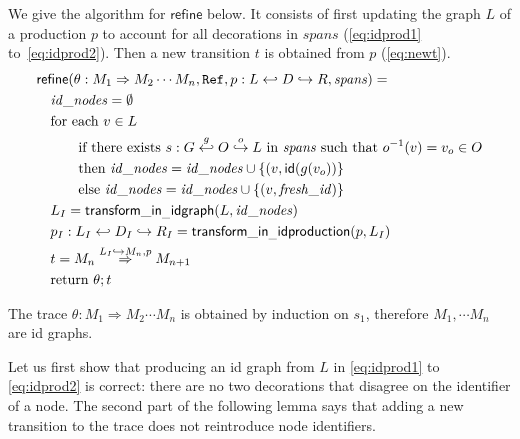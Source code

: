 We give the algorithm for $\mathsf{refine}$ below. It consists of first updating the graph $L$ of a production $p$ to account for all decorations in $\mathit{spans}$ (\autoref{eq:idprod1} to~\autoref{eq:idprod2}). Then a new transition $t$ is obtained from $p$ (\autoref{eq:newt}).
\begin{align}
  &\mathsf{refine}(\theta:M_1\Rightarrow M_2\cdots M_n,\mathtt{Ref},p:L\hookleftarrow D\hookrightarrow R,\mathit{spans}) = \\
  \label{eq:idprod1}
  &\quad\mathit{id\_nodes} = \emptyset\\
  &\quad\text{for each }v\in L\\
  &\quad\qquad\text{if there exists }s:G\overset{g}{\hookleftarrow}O\overset{o}{\hookrightarrow}L\text{ in }\mathit{spans}\text{ such that }
  o^{-1}(v)=v_o\in O\\
  &\quad\qquad\text{then }\mathit{id\_nodes} =\mathit{id\_nodes} \cup\{(v,\mathsf{id}(g(v_o))\}\\
  &\quad\qquad\text{else }\mathit{id\_nodes} =\mathit{id\_nodes} \cup\{(v,\mathit{fresh\_id})\}\\
  &\quad L_I = \mathsf{transform\_in_\_idgraph}(L,\mathit{id\_nodes})\\
  \label{eq:idprod2}
  &\quad p_I:L_I\hookleftarrow D_I\hookrightarrow R_I = \mathsf{transform\_in_\_idproduction}(p,L_I)\\
  \label{eq:newt}
  &\quad t = M_n\overset{L_I\hookrightarrow M_n,p}{\Rightarrow} M_{n+1}\\
  &\quad \text{return }\theta;t
\end{align}

The trace $\theta:M_1\Rightarrow M_2\cdots M_n$ is obtained by induction on $s_1$, therefore $M_1,\cdots M_n$ are id graphs.

Let us first show that producing an id graph from $L$ in \autoref{eq:idprod1} to \autoref{eq:idprod2} is correct: there are no two decorations that disagree on the identifier of a node. The second part of the following lemma says that adding a new transition to the trace does not reintroduce node identifiers.

